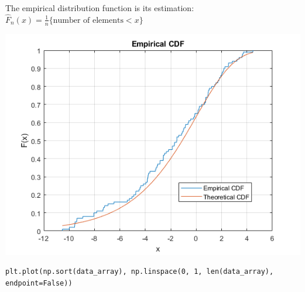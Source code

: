 The empirical distribution function is its estimation:
$\widehat{F}_n(x) = \frac{1}{n}\{\text{number of elements} < x\}$

\begin{center}
\includegraphics[scale=0.4]{CDF.png}
\end{center}

\lstset{language=Python}
\lstset{frame=lines}
\lstset{basicstyle=\footnotesize}
\begin{lstlisting}
plt.plot(np.sort(data_array), np.linspace(0, 1, len(data_array), endpoint=False))
\end{lstlisting}

\vspace{5mm}